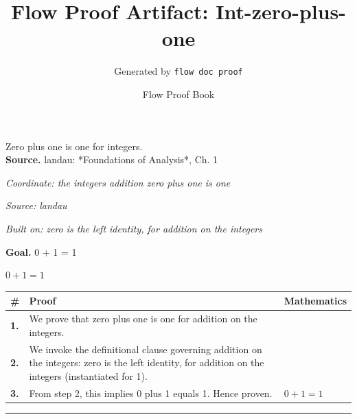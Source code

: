\documentclass[11pt]{article}
\title{Flow Proof Artifact: Int-zero-plus-one}
\author{Generated by \texttt{flow doc proof}}
\date{Flow Proof Book}
\theoremstyle{definition}
\begin{document}
\maketitle
Zero plus one is one for integers.\\[0.5em]
\textbf{Source.} landau: *Foundations of Analysis*, Ch. 1\\[0.5em]
\bigskip
{}\par
\smallskip\noindent\textit{Coordinate: the integers \cdot addition \cdot zero plus one is one}\par
\smallskip\noindent\textit{Source: landau}\par
\smallskip\noindent\textit{Built on: zero is the left identity, for addition on the integers}\par
\medskip
\noindent\textbf{Goal.} 0 + 1 = 1\par
\noindent$\displaystyle 0 + 1 = 1$\par
\medskip
\noindent
\begin{tabular}{@{} >{\raggedright\arraybackslash}p{} >{\raggedright\arraybackslash}p{} >{\raggedleft\arraybackslash}p{} @{}}
\textbf{\#} & \textbf{Proof} & \textbf{Mathematics} \\
\midrule
\textbf{1.} & We prove that zero plus one is one for addition on the integers. & \\[0.45em]
\textbf{2.} & We invoke the definitional clause governing addition on the integers: zero is the left identity, for addition on the integers (instantiated for 1). & \\[0.45em]
\textbf{3.} & From step 2, this implies 0 plus 1 equals 1. Hence proven. & $\displaystyle 0 + 1 = 1$ \\[0.45em]
\bottomrule
\end{tabular}
\label{thm:Int-addition-zero_plus_one_is_one}
\par\medskip\hrule
\end{document}
